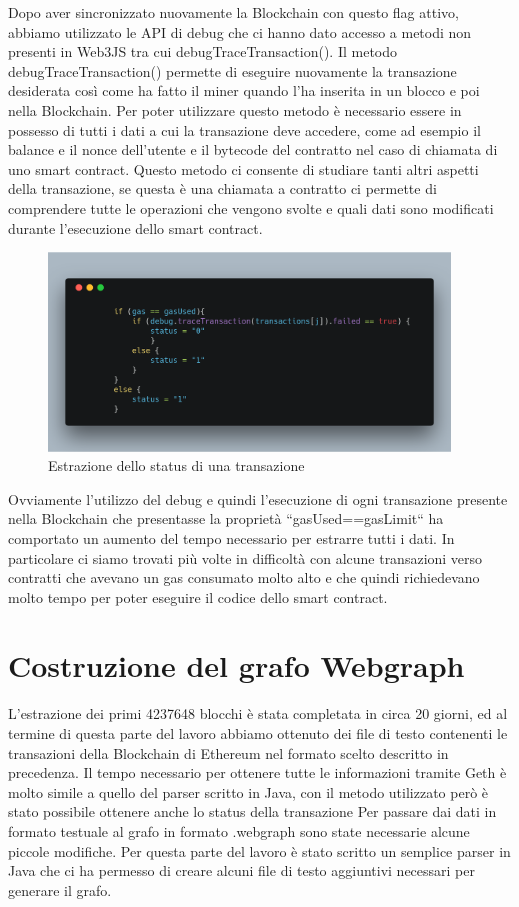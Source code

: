 \documentclass[12pt]{report}
\begin{document}
Dopo aver sincronizzato nuovamente la Blockchain con questo flag attivo, abbiamo utilizzato le API di debug che ci hanno dato accesso a metodi non presenti in Web3JS tra cui debugTraceTransaction().
Il metodo debugTraceTransaction() permette di eseguire nuovamente la transazione desiderata così come ha fatto il miner quando l'ha inserita in un blocco e poi nella Blockchain.
Per poter utilizzare questo metodo è necessario essere in possesso di tutti i dati a cui la transazione deve accedere, come ad esempio il balance e il nonce dell'utente e il bytecode del contratto nel caso di chiamata di uno smart contract.
Questo metodo ci consente di studiare tanti altri aspetti della transazione, se questa è una chiamata a contratto ci permette di comprendere tutte le operazioni che vengono svolte e quali dati sono modificati durante l'esecuzione dello smart contract.

\begin{figure}[H]
    \centering\includegraphics[width=0.95\textwidth]{carbon-21}
    \caption{Estrazione dello status di una transazione}
\end{figure}
Ovviamente l'utilizzo del debug e quindi l'esecuzione di ogni transazione presente nella Blockchain che presentasse la proprietà ``gasUsed==gasLimit`` ha comportato un aumento del tempo necessario per estrarre tutti i dati. 
In particolare ci siamo trovati più volte in difficoltà con alcune transazioni verso contratti che avevano un gas consumato molto alto e che quindi richiedevano molto tempo per poter eseguire il codice dello smart contract.

\section{Costruzione del grafo Webgraph}

L'estrazione dei primi 4237648 blocchi è stata completata in circa 20 giorni, ed al termine di questa parte del lavoro abbiamo ottenuto dei file di testo contenenti le transazioni della Blockchain di Ethereum nel formato scelto descritto in precedenza. 
Il tempo necessario per ottenere tutte le informazioni tramite Geth è molto simile a quello del parser scritto in Java, con il metodo utilizzato però è stato possibile ottenere anche lo status della transazione
Per passare dai dati in formato testuale al grafo in formato .webgraph sono state necessarie alcune piccole modifiche.
Per questa parte del lavoro è stato scritto un semplice parser in Java che ci ha permesso di creare alcuni file di testo aggiuntivi necessari per generare il grafo.
\end{document}
